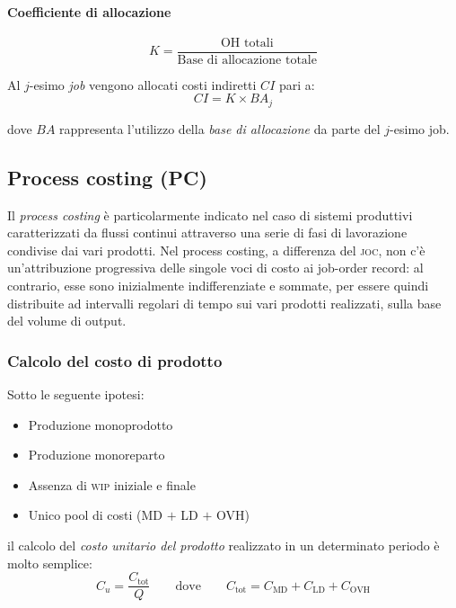 \paragraph{Coefficiente di allocazione}
\begin{equation*}
    K = \frac{\text{OH totali}}{\text{Base di allocazione totale}}
\end{equation*}

Al $j$-esimo \emph{job} vengono allocati costi indiretti $CI$ pari a:
\begin{equation*}
    CI = K \times BA_j
\end{equation*}

dove $BA$ rappresenta l'utilizzo della \emph{base di allocazione} da parte del $j$-esimo job.

\subsection{Process costing (PC)}
Il \emph{process costing} è particolarmente indicato nel caso di sistemi
produttivi caratterizzati da flussi continui attraverso una serie di fasi
di lavorazione condivise dai vari prodotti.
Nel process costing, a differenza del \textsc{joc}, non c'è un’attribuzione
progressiva delle singole voci di costo ai job-order record: al
contrario, esse sono inizialmente indifferenziate e sommate, per
essere quindi distribuite ad intervalli regolari di tempo sui vari
prodotti realizzati, sulla base del volume di output.

\subsubsection{Calcolo del costo di prodotto} Sotto le seguente ipotesi:
\begin{itemize}
    \item Produzione monoprodotto
    \item Produzione monoreparto
    \item Assenza di \textsc{wip} iniziale e finale
    \item Unico pool di costi (MD $+$ LD $+$ OVH)
\end{itemize}
il calcolo del \emph{costo unitario del prodotto} realizzato in un determinato
periodo è molto semplice:
\begin{equation*}
    C_u = \frac{C_{\text{tot}}}{Q} \qquad
    \text{dove} \qquad C_\text{tot} = C_\text{MD} + C_\text{LD} + C_\text{OVH}
\end{equation*}

